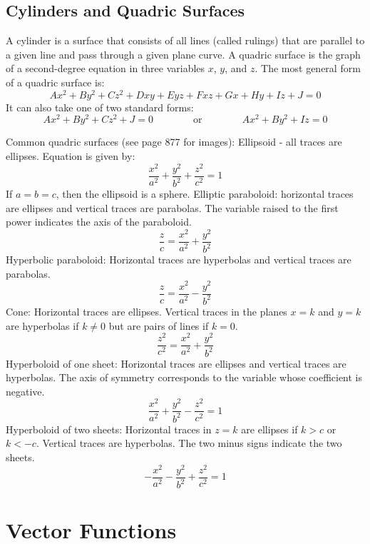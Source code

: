 \documentclass{article}
\begin{document}
    \subsection{Cylinders and Quadric Surfaces}
    \begin{outline}
        \1 A cylinder is a surface that consists of all lines (called rulings) that are parallel to a given line and pass through a given plane curve. 
        \1 A quadric surface is the graph of a second-degree equation in three variables \(x\), \(y\), and \(z\). The most general form of a quadric surface is: \[Ax^2+By^2+Cz^2+Dxy+Eyz+Fxz+Gx+Hy+Iz+J=0\]
        \1 It can also take one of two standard forms: \[Ax^2+By^2+Cz^2+J=0\qquad\qquad\text{or}\qquad\qquad Ax^2+By^2+Iz=0\]

    \end{outline}\begin{outline}

    \0 Common quadric surfaces (see page 877 for images): 
        \1 Ellipsoid - all traces are ellipses. Equation is given by: \[\dfrac{x^2}{a^2}+\dfrac{y^2}{b^2}+\dfrac{z^2}{c^2}=1\] If \(a=b=c\), then the ellipsoid is a sphere. 
        \1 Elliptic paraboloid: horizontal traces are ellipses and vertical traces are parabolas. The variable raised to the first power indicates the axis of the paraboloid. \[\dfrac{z}{c}=\dfrac{x^2}{a^2}+\dfrac{y^2}{b^2}\]
        \1 Hyperbolic paraboloid: Horizontal traces are hyperbolas and vertical traces are parabolas. \[\dfrac{z}{c}=\dfrac{x^2}{a^2}-\dfrac{y^2}{b^2}\]
        \1 Cone: Horizontal traces are ellipses. Vertical traces in the planes \(x=k\) and \(y=k\) are hyperbolas if \(k\neq 0\) but are pairs of lines if \(k=0\). \[\dfrac{z^2}{c^2}=\dfrac{x^2}{a^2}+\dfrac{y^2}{b^2}\]
        \1 Hyperboloid of one sheet: Horizontal traces are ellipses and vertical traces are hyperbolas. The axis of symmetry corresponds to the variable whose coefficient is negative. \[\dfrac{x^2}{a^2}+\dfrac{y^2}{b^2}-\dfrac{z^2}{c^2}=1\]
        \1 Hyperboloid of two sheets: Horizontal traces in \(z=k\) are ellipses if \(k>c\) or \(k<-c\). Vertical traces are hyperbolas. The two minus signs indicate the two sheets. \[-\dfrac{x^2}{a^2}-\dfrac{y^2}{b^2}+\dfrac{z^2}{c^2}=1\]
        
    \end{outline}

    \section{Vector Functions} %
\end{document}
